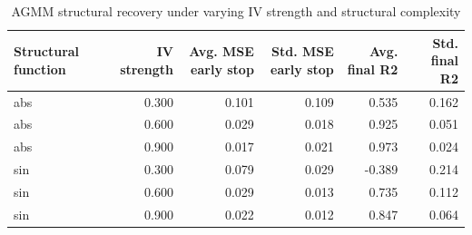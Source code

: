 \begin{table}
\caption{AGMM structural recovery under varying IV strength and structural complexity}
\label{tab:agmm_iv_strength_tau_summary}
\begin{tabular}{lrrrrr}
\toprule
Structural function & IV strength & Avg. MSE early stop & Std. MSE early stop & Avg. final R2 & Std. final R2 \\
\midrule
abs & 0.300 & 0.101 & 0.109 & 0.535 & 0.162 \\
abs & 0.600 & 0.029 & 0.018 & 0.925 & 0.051 \\
abs & 0.900 & 0.017 & 0.021 & 0.973 & 0.024 \\
sin & 0.300 & 0.079 & 0.029 & -0.389 & 0.214 \\
sin & 0.600 & 0.029 & 0.013 & 0.735 & 0.112 \\
sin & 0.900 & 0.022 & 0.012 & 0.847 & 0.064 \\
\bottomrule
\end{tabular}
\end{table}
